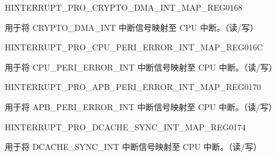 \begin{register}{H}{INTERRUPT\_PRO\_CRYPTO\_DMA\_INT\_MAP\_REG}{\hexprefix{}0168}\label{regdesc:INTERRUPTPROCRYPTODMAINTMAPREG}
%
%
\regnewline%
\begin{regdesc}\begin{reglist}
\label{fielddesc:INTERRUPTPROCRYPTODMAINTMAP}\item [INTERRUPT\_PRO\_CRYPTO\_DMA\_INT\_MAP] 用于将 CRYPTO\_DMA\_INT 中断信号映射至 CPU 中断。（读/写）
\end{reglist}\end{regdesc}
\end{register}


\begin{register}{H}{INTERRUPT\_PRO\_CPU\_PERI\_ERROR\_INT\_MAP\_REG}{\hexprefix{}016C}\label{regdesc:INTERRUPTPROCPUPERIERRORINTMAPREG}
%
%
\regnewline%
\begin{regdesc}\begin{reglist}
\label{fielddesc:INTERRUPTPROCPUPERIERRORINTMAP}\item [INTERRUPT\_PRO\_CPU\_PERI\_ERROR\_INT\_MAP] 用于将 CPU\_PERI\_ERROR\_INT 中断信号映射至 CPU 中断。（读/写）
\end{reglist}\end{regdesc}
\end{register}


\begin{register}{H}{INTERRUPT\_PRO\_APB\_PERI\_ERROR\_INT\_MAP\_REG}{\hexprefix{}0170}\label{regdesc:INTERRUPTPROAPBPERIERRORINTMAPREG}
%
%
\regnewline%
\begin{regdesc}\begin{reglist}
\label{fielddesc:INTERRUPTPROAPBPERIERRORINTMAP}\item [INTERRUPT\_PRO\_APB\_PERI\_ERROR\_INT\_MAP] 用于将 APB\_PERI\_ERROR\_INT 中断信号映射至 CPU 中断。（读/写）
\end{reglist}\end{regdesc}
\end{register}


\begin{register}{H}{INTERRUPT\_PRO\_DCACHE\_SYNC\_INT\_MAP\_REG}{\hexprefix{}0174}\label{regdesc:INTERRUPTPRODCACHESYNCINTMAPREG}
%
%
\regnewline%
\begin{regdesc}\begin{reglist}
\label{fielddesc:INTERRUPTPRODCACHESYNCINTMAP}\item [INTERRUPT\_PRO\_DCACHE\_SYNC\_INT\_MAP] 用于将 DCACHE\_SYNC\_INT 中断信号映射至 CPU 中断。（读/写）
\end{reglist}\end{regdesc}
\end{register}


